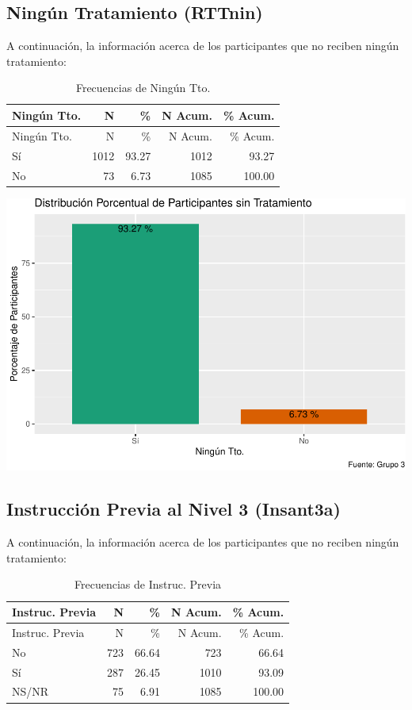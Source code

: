 \documentclass[
]{article}
\begin{document}
\subsection{Ningún Tratamiento
(RTTnin)}\label{ninguxfan-tratamiento-rttnin}

A continuación, la información acerca de los participantes que no
reciben ningún tratamiento:

\begin{longtable}[]{@{}lrrrr@{}}
\caption{Frecuencias de Ningún Tto.}\tabularnewline
\toprule\noalign{}
Ningún Tto. & N & \% & N Acum. & \% Acum. \\
\midrule\noalign{}
\endfirsthead
\toprule\noalign{}
Ningún Tto. & N & \% & N Acum. & \% Acum. \\
\midrule\noalign{}
\endhead
\bottomrule\noalign{}
\endlastfoot
Sí & 1012 & 93.27 & 1012 & 93.27 \\
No & 73 & 6.73 & 1085 & 100.00 \\
\end{longtable}

\includegraphics{Info_Dinix_02_files/figure-latex/30_RTTnin-1.pdf}

\subsection{Instrucción Previa al Nivel 3
(Insant3a)}\label{instrucciuxf3n-previa-al-nivel-3-insant3a}

A continuación, la información acerca de los participantes que no
reciben ningún tratamiento:

\begin{longtable}[]{@{}lrrrr@{}}
\caption{Frecuencias de Instruc. Previa}\tabularnewline
\toprule\noalign{}
Instruc. Previa & N & \% & N Acum. & \% Acum. \\
\midrule\noalign{}
\endfirsthead
\toprule\noalign{}
Instruc. Previa & N & \% & N Acum. & \% Acum. \\
\midrule\noalign{}
\endhead
\bottomrule\noalign{}
\endlastfoot
No & 723 & 66.64 & 723 & 66.64 \\
Sí & 287 & 26.45 & 1010 & 93.09 \\
NS/NR & 75 & 6.91 & 1085 & 100.00 \\
\end{longtable}
\end{document}
